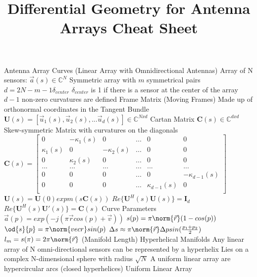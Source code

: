 \documentclass[14pt]{extarticle}
\title{Differential Geometry for Antenna Arrays Cheat Sheet}
\begin{document}
	\maketitle
	\begin{outline}
		\1	Antenna Array Curves (Linear Array with Omnidirectional Antennas)
			\2	Array of N sensors: $\vec{a}(s) \in \mathbb{C}^N$
				\3	Symmetric array with $m$ symmetrical pairs
				\3	$d = 2N - m - 1\delta_{center}$
				\3	$\delta_{center}$ is 1 if there is a sensor at the center of the array
				\3	$d-1$ non-zero curvatures are defined 
			\2	Frame Matrix (Moving Frames)
				\3	Made up of orthonormal coordinates in the Tangent Bundle
				\3	$\bm{U}(s) = [\vec{u}_1(s), \vec{u}_2(s),...\vec{u}_d(s)] \in \mathbb{C}^{N x d}$	
				\3	Cartan Matrix $\bm{C}(s) \in \mathbb{C}^{d x d}$
					\4	Skew-symmetric Matrix with curvatures on the diagonals	
					\4	$\bm{C}(s) = \begin{bmatrix}
								0 & -\kappa_1(s) & 0 & ... & 0 & 0 \\
								\kappa_1(s) & 0 & -\kappa_2(s) & ... & 0 & 0 \\
								0 & \kappa_2(s) & 0 & ... & 0 & 0 \\
								... & ... & ... & ... & ... & ... \\
								0 & 0 & 0 & ... & 0 & -\kappa_{d-1}(s) \\
								0 & 0 & 0 & ... & \kappa_{d-1}(s) & 0 \\ 
							 \end{bmatrix}$
				\3	$\bm{U}(s) = \bm{U}(0) expm(s \bm{C}(s))$
				\3	$Re\{\bm{U}^H(s)\bm{U}(s)\} = \bm{I}_d$
				\3	$Re\{\bm{U}^H(s)\bm{U}'(s)\} = \bm{C}(s)$ 	
			\2	Curve Parameters
				\3	$\vec{a}(p) = exp(-j(\pi \vec{r}cos(p) + \vec{v}))$
				\3	$s(p) = \pi \norm{\vec{r}}(1 - cos(p))$
				\3	$\od{s}{p} = \pi \norm{vec{r}}sin(p)$
				\3	$\Delta s \approx \pi \norm{\vec{r}}\Delta p sin(\frac{p_1 + p_2}{2})$
				\3	$l_m = s(\pi) = 2\pi \norm{\vec{r}}$ (Manifold Length)
			\2	Hyperhelical Manifolds
				\3	Any linear array of N omni-directional sensors can be represented by a hyperhelix
				\3	Lies on a complex N-dimensional sphere with radius $\sqrt{N}$
				\3	A uniform linear array are hypercircular arcs (closed hyperhelices)
			\2	Uniform Linear Array %
	\end{outline}
\end{document}
